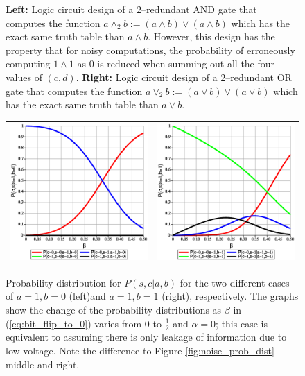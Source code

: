\begin{figure}
\begin{minipage}[c]{.45\linewidth}
    \end{minipage}
    \caption{{\bf Left:} Logic circuit design of a $2$--redundant AND gate that computes the function $a \land_2 b := (a \land b) \lor (a \land b)$ which has the exact same truth table than $a \land b$. However, this design has the property that for noisy computations, the probability of erroneously computing $1 \land 1$ as $0$ is reduced when summing out all the four values of $(c,d)$. {\bf Right:} Logic circuit design of a $2$--redundant OR gate that computes the function $a \lor_2 b := (a \lor b) \lor (a \lor b)$ which has the exact same truth table than $a \lor b$.}
\end{figure}

\begin{figure}
    \begin{center}
        \begin{tabular}{cc}
            \includegraphics[width=.4\textwidth]{media/noisy_half_adder_16_redundancy_value_dist_10.eps} &
            \includegraphics[width=.4\textwidth]{media/noisy_half_adder_16_redundancy_value_dist_11.eps}
        \end{tabular}
    \end{center}
    \caption{Probability distribution for $P(s,c|a,b)$ for the two different cases of $a=1, b=0$ (left)and $a=1, b=1$ (right), respectively. The graphs show the change of the probability distributions as $\beta$ in (\ref{eq:bit_flip_to_0}) varies from $0$ to $\frac{1}{2}$ and $\alpha = 0$; this case is equivalent to assuming there is only leakage of information due to low-voltage. Note the difference to Figure \ref{fig:noise_prob_dist} middle and right. \label{fig:noise_prob_dist_redudancy}}
\end{figure}


